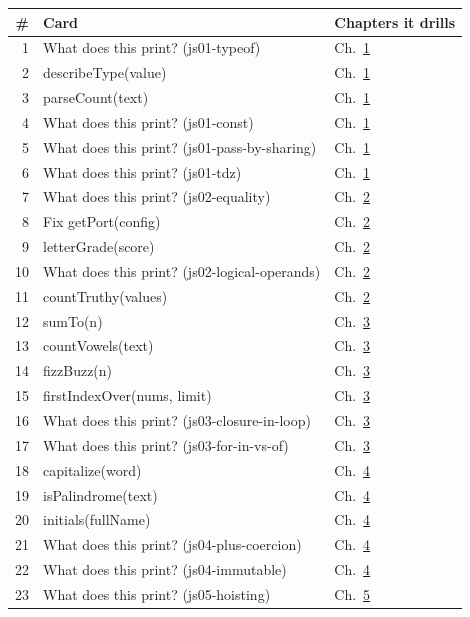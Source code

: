 \documentclass[10pt]{article}
\newcommand{\code}[1]{{\ttfamily\small #1}}
\begin{document}
{\footnotesize\begin{tabularx}{\linewidth}{@{}rXl@{}}\toprule
\textbf{\#} & \textbf{Card} & \textbf{Chapters it drills}\\\midrule
1 & What does this print? (js01-typeof) & Ch.~\hyperref[ch:c01]{1}\\
2 & \code{describeType(value)} & Ch.~\hyperref[ch:c01]{1}\\
3 & \code{parseCount(text)} & Ch.~\hyperref[ch:c01]{1}\\
4 & What does this print? (js01-const) & Ch.~\hyperref[ch:c01]{1}\\
5 & What does this print? (js01-pass-by-sharing) & Ch.~\hyperref[ch:c01]{1}\\
6 & What does this print? (js01-tdz) & Ch.~\hyperref[ch:c01]{1}\\
7 & What does this print? (js02-equality) & Ch.~\hyperref[ch:c02]{2}\\
8 & \code{Fix getPort(config)} & Ch.~\hyperref[ch:c02]{2}\\
9 & \code{letterGrade(score)} & Ch.~\hyperref[ch:c02]{2}\\
10 & What does this print? (js02-logical-operands) & Ch.~\hyperref[ch:c02]{2}\\
11 & \code{countTruthy(values)} & Ch.~\hyperref[ch:c02]{2}\\
12 & \code{sumTo(n)} & Ch.~\hyperref[ch:c03]{3}\\
13 & \code{countVowels(text)} & Ch.~\hyperref[ch:c03]{3}\\
14 & \code{fizzBuzz(n)} & Ch.~\hyperref[ch:c03]{3}\\
15 & \code{firstIndexOver(nums, limit)} & Ch.~\hyperref[ch:c03]{3}\\
16 & What does this print? (js03-closure-in-loop) & Ch.~\hyperref[ch:c03]{3}\\
17 & What does this print? (js03-for-in-vs-of) & Ch.~\hyperref[ch:c03]{3}\\
18 & \code{capitalize(word)} & Ch.~\hyperref[ch:c04]{4}\\
19 & \code{isPalindrome(text)} & Ch.~\hyperref[ch:c04]{4}\\
20 & \code{initials(fullName)} & Ch.~\hyperref[ch:c04]{4}\\
21 & What does this print? (js04-plus-coercion) & Ch.~\hyperref[ch:c04]{4}\\
22 & What does this print? (js04-immutable) & Ch.~\hyperref[ch:c04]{4}\\
23 & What does this print? (js05-hoisting) & Ch.~\hyperref[ch:c05]{5}\\

\end{tabularx}}
\end{document}
